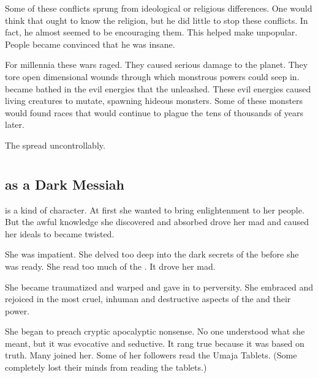 Some of these conflicts sprung from ideological or religious differences. 
One would think that \Sethicus ought to know the  religion, but he did little to stop these conflicts. 
In fact, he almost seemed to be encouraging them. 
This helped make \Sethicus unpopular. 
People became convinced that he was insane.

For millennia these wars raged. 
They caused serious damage to the planet.
They tore open dimensional wounds through which monstrous powers could seep in. 
\Miith became bathed in the evil \xs energies that the \dragons unleashed. 
These evil energies caused living creatures to mutate, spawning hideous monsters. 
Some of these monsters would found races that would continue to plague the \wylde tens of thousands of years later.

The \wylde spread uncontrollably.















\section[Tyrasshana]{\Tiamat}









\subsection[Tyrasshana as a Dark Messiah]{\Tiamat{} as a Dark Messiah}
\Tiamat{} is a  kind of character. 
At first she wanted to bring enlightenment to her people. 
But the awful knowledge she discovered and absorbed drove her mad and caused her ideals to became twisted. 

She was impatient. 
She delved too deep into the dark secrets of the \xss before she was ready.
She read too much of the .
It drove her mad. 

She became traumatized and warped and gave in to perversity. 
She embraced and rejoiced in the most cruel, inhuman and destructive aspects of the \xss{} and their power. 

She began to preach cryptic apocalyptic nonsense. 
No one understood what she meant, but it was evocative and seductive.
It rang true because it was based on truth.
Many joined her.
Some of her followers read the Umaja Tablets. 
(Some completely lost their minds from reading the tablets.)

